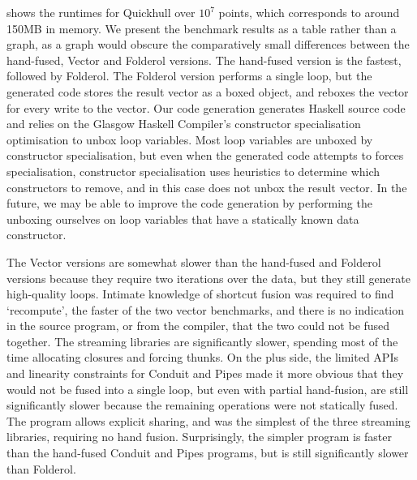  shows the runtimes for Quickhull over $10^7$ points, which corresponds to around 150MB in memory.
We present the benchmark results as a table rather than a graph, as a graph would obscure the comparatively small differences between the hand-fused, Vector and Folderol versions.
The hand-fused version is the fastest, followed by Folderol.
The Folderol version performs a single loop, but the generated code stores the result vector as a boxed object, and reboxes the vector for every write to the vector.
Our code generation generates Haskell source code and relies on the Glasgow Haskell Compiler's constructor specialisation optimisation \citep{peyton2007call} to unbox loop variables.
Most loop variables are unboxed by constructor specialisation, but even when the generated code attempts to forces specialisation, constructor specialisation uses heuristics to determine which constructors to remove, and in this case does not unbox the result vector.
In the future, we may be able to improve the code generation by performing the unboxing ourselves on loop variables that have a statically known data constructor.

The Vector versions are somewhat slower than the hand-fused and Folderol versions because they require two iterations over the data, but they still generate high-quality loops.
Intimate knowledge of shortcut fusion was required to find `recompute', the faster of the two vector benchmarks, and there is no indication in the source program, or from the compiler, that the two could not be fused together.
The streaming libraries are significantly slower, spending most of the time allocating closures and forcing thunks.
On the plus side, the limited APIs and linearity constraints for Conduit and Pipes made it more obvious that they would not be fused into a single loop, but even with partial hand-fusion, are still significantly slower because the remaining operations were not statically fused.
The \Streaming program allows explicit sharing, and was the simplest of the three streaming libraries, requiring no hand fusion.
Surprisingly, the simpler \Streaming program is faster than the hand-fused Conduit and Pipes programs, but is still significantly slower than Folderol.


